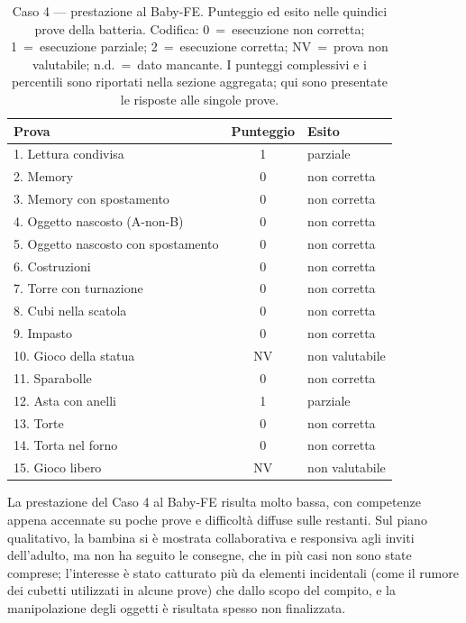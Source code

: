 \begin{table}[htbp]
\centering
\caption[Caso 4 --- prestazione al Baby-FE]{Caso 4 --- prestazione al Baby-FE. Punteggio ed esito nelle quindici prove della batteria. Codifica: 0~=~esecuzione non corretta; 1~=~esecuzione parziale; 2~=~esecuzione corretta; NV~=~prova non valutabile; n.d.~=~dato mancante. I punteggi complessivi e i percentili sono riportati nella sezione aggregata; qui sono presentate le risposte alle singole prove.}
\label{tab:caso4_prove}
\begin{tabular}{|l|c|l|}
\toprule
\textbf{Prova} & \textbf{Punteggio} & \textbf{Esito} \\
\midrule
1. Lettura condivisa & 1 & parziale \\
2. Memory & 0 & non corretta \\
3. Memory con spostamento & 0 & non corretta \\
4. Oggetto nascosto (A-non-B) & 0 & non corretta \\
5. Oggetto nascosto con spostamento & 0 & non corretta \\
6. Costruzioni & 0 & non corretta \\
7. Torre con turnazione & 0 & non corretta \\
8. Cubi nella scatola & 0 & non corretta \\
9. Impasto & 0 & non corretta \\
10. Gioco della statua & NV & non valutabile \\
11. Sparabolle & 0 & non corretta \\
12. Asta con anelli & 1 & parziale \\
13. Torte & 0 & non corretta \\
14. Torta nel forno & 0 & non corretta \\
15. Gioco libero & NV & non valutabile \\
\bottomrule
\end{tabular}
\end{table}

La prestazione del Caso 4 al Baby-FE risulta molto bassa, con competenze appena accennate su poche prove e difficoltà diffuse sulle restanti. Sul piano qualitativo, la bambina si è mostrata collaborativa e responsiva agli inviti dell'adulto, ma non ha seguito le consegne, che in più casi non sono state comprese; l'interesse è stato catturato più da elementi incidentali (come il rumore dei cubetti utilizzati in alcune prove) che dallo scopo del compito, e la manipolazione degli oggetti è risultata spesso non finalizzata.

